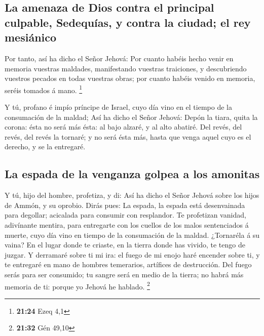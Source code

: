\hypertarget{la-amenaza-de-dios-contra-el-principal-culpable-sedequuxedas-y-contra-la-ciudad-el-rey-mesiuxe1nico}{%
\subsection{La amenaza de Dios contra el principal culpable, Sedequías,
y contra la ciudad; el rey
mesiánico}\label{la-amenaza-de-dios-contra-el-principal-culpable-sedequuxedas-y-contra-la-ciudad-el-rey-mesiuxe1nico}}

 Por tanto, así ha dicho el Señor Jehová: Por cuanto
habéis hecho venir en memoria vuestras maldades, manifestando vuestras
traiciones, y descubriendo vuestros pecados en todas vuestras obras; por
cuanto habéis venido en memoria, seréis tomados á mano. \footnote{\textbf{21:24}
  Ezeq 4,1}

 Y tú, profano é impío príncipe de Israel, cuyo día vino
en el tiempo de la consumación de la maldad;  Así ha
dicho el Señor Jehová: Depón la tiara, quita la corona: ésta no será más
ésta: al bajo alzaré, y al alto abatiré.  Del revés, del
revés, del revés la tornaré; y no será ésta más, hasta que venga aquel
cuyo es el derecho, y se la entregaré.

\hypertarget{la-espada-de-la-venganza-golpea-a-los-amonitas}{%
\subsection{La espada de la venganza golpea a los
amonitas}\label{la-espada-de-la-venganza-golpea-a-los-amonitas}}

 Y tú, hijo del hombre, profetiza, y di: Así ha dicho el
Señor Jehová sobre los hijos de Ammón, y su oprobio. Dirás pues: La
espada, la espada está desenvainada para degollar; acicalada para
consumir con resplandor.  Te profetizan vanidad,
adivínante mentira, para entregarte con los cuellos de los malos
sentenciados á muerte, cuyo día vino en tiempo de la consumación de la
maldad.  ¿Tornaréla á su vaina? En el lugar donde te
criaste, en la tierra donde has vivido, te tengo de juzgar.
 Y derramaré sobre ti mi ira: el fuego de mi enojo haré
encender sobre ti, y te entregaré en mano de hombres temerarios,
artífices de destrucción.  Del fuego serás para ser
consumido; tu sangre será en medio de la tierra; no habrá más memoria de
ti: porque yo Jehová he hablado. \footnote{\textbf{21:32} Gén 49,10}

